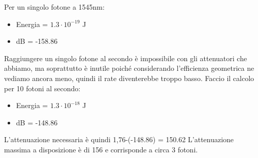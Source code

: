 \documentclass{article}
\begin{document}
Per un singolo fotone a 1545nm:
\begin{itemize}
    \item Energia = $1.3\cdot10^{-19}$ J
    \item dB = -158.86
\end{itemize}

Raggiungere un singolo fotone al secondo è impossibile con gli attenuatori che abbiamo, ma soprattutto è inutile poiché considerando l'efficienza geometrica ne vediamo ancora meno, quindi il rate diventerebbe troppo basso. 
Faccio il calcolo per 10 fotoni al secondo:
\begin{itemize}
    \item Energia = $1.3\cdot10^{-18}$ J
    \item dB = -148.86
\end{itemize}
L'attenuazione necessaria è quindi 1,76-(-148.86) = 150.62
L'attenuazione massima a disposizione è di 156 e corrisponde a circa 3 fotoni.
\end{document}
